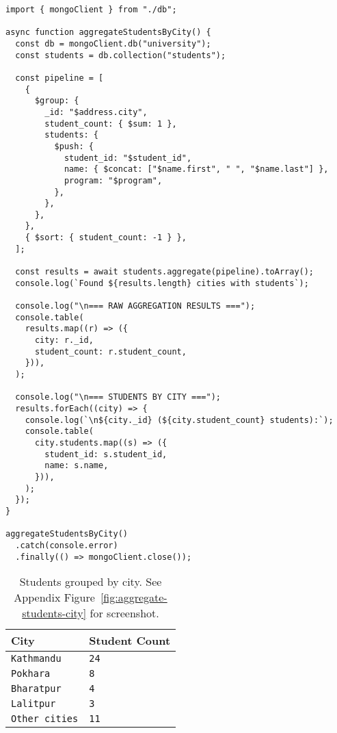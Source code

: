\begin{verbatim}
import { mongoClient } from "./db";

async function aggregateStudentsByCity() {
  const db = mongoClient.db("university");
  const students = db.collection("students");

  const pipeline = [
    {
      $group: {
        _id: "$address.city",
        student_count: { $sum: 1 },
        students: {
          $push: {
            student_id: "$student_id",
            name: { $concat: ["$name.first", " ", "$name.last"] },
            program: "$program",
          },
        },
      },
    },
    { $sort: { student_count: -1 } },
  ];

  const results = await students.aggregate(pipeline).toArray();
  console.log(`Found ${results.length} cities with students`);

  console.log("\n=== RAW AGGREGATION RESULTS ===");
  console.table(
    results.map((r) => ({
      city: r._id,
      student_count: r.student_count,
    })),
  );

  console.log("\n=== STUDENTS BY CITY ===");
  results.forEach((city) => {
    console.log(`\n${city._id} (${city.student_count} students):`);
    console.table(
      city.students.map((s) => ({
        student_id: s.student_id,
        name: s.name,
      })),
    );
  });
}

aggregateStudentsByCity()
  .catch(console.error)
  .finally(() => mongoClient.close());
\end{verbatim}

\begin{table}[H]
  \centering
  \begin{tabular}{|l|l|}
    \hline
    \textbf{City} & \textbf{Student Count} \\
    \hline
    \texttt{Kathmandu}     & \texttt{24}                     \\
    \texttt{Pokhara}       & \texttt{8}                      \\
    \texttt{Bharatpur}     & \texttt{4}                      \\
    \texttt{Lalitpur}      & \texttt{3}                      \\
    \texttt{Other cities}  & \texttt{11}                     \\
    \hline
  \end{tabular}
  \caption{Students grouped by city. See Appendix Figure~\ref{fig:aggregate-students-city} for screenshot.}
\end{table}

